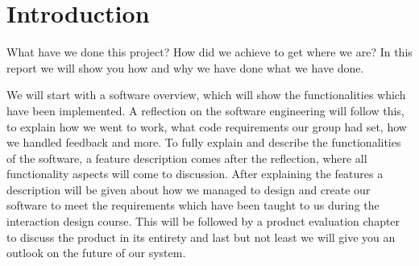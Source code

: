 \chapter{Introduction} %

What have we done this project? How did we achieve to get where we are? In this report we will show you how and why we have done what we have done.

We will start with a software overview, which will show the functionalities which have been implemented. A reflection on the software engineering will follow this, to explain how we went to work, what code requirements our group had set, how we handled feedback and more. To fully explain and describe the functionalities of the software, a feature description comes after the reflection, where all functionality aspects will come to discussion. After explaining the features a description will be given about how we managed to design and create our software to meet the requirements which have been taught to us during the interaction design course. This will be followed by a product evaluation chapter to discuss the product in its entirety and last but not least we will give you an outlook on the future of our system. 